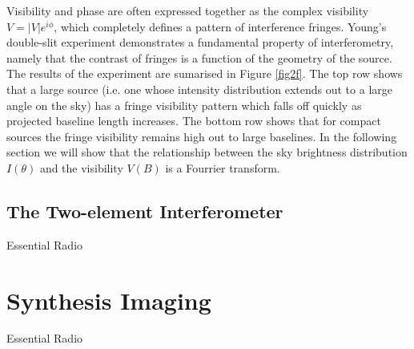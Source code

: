 Visibility and phase are often expressed together as the complex visibility $V=|V|e^{i\phi}$, which completely defines a pattern of interference fringes. Young's double-slit experiment demonstrates a fundamental property of interferometry, namely that the contrast of fringes is a function of the geometry of the source. The results of the experiment are sumarised in Figure \ref{fig2f}. The top row shows that a large source (i.e. one whose intensity distribution extends out to a large angle on the sky) has a fringe visibility pattern which falls off quickly as projected baseline length increases. The bottom row shows that for compact sources the fringe visibility remains high out to large baselines. In the following section we will show that the relationship between the sky brightness distribution $I(\theta)$ and the visibility $V(B)$ is a Fourrier transform.


\subsection{The Two-element Interferometer}\label{subsec:5}
Essential Radio 
\section{Synthesis Imaging}\label{sec:4}
Essential Radio 
